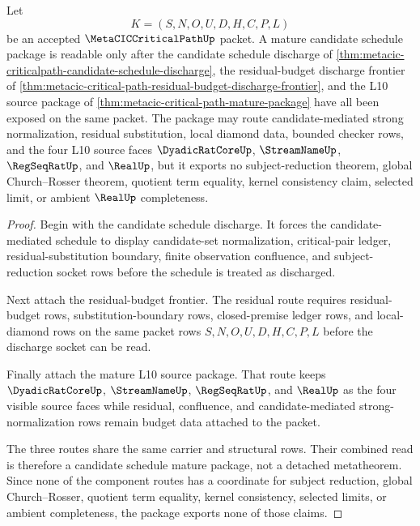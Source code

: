 \begin{theorem}
\label{thm:metaciccriticalpath-candidate-schedule-mature-package}
Let
$$
K=(S,N,O,U,D,H,C,P,L)
$$
be an accepted $\MetaCICCriticalPathUp$ packet. A mature candidate schedule package is readable only after the candidate schedule discharge of \autoref{thm:metacic-criticalpath-candidate-schedule-discharge}, the residual-budget discharge frontier of \autoref{thm:metacic-critical-path-residual-budget-discharge-frontier}, and the L10 source package of \autoref{thm:metacic-critical-path-mature-package} have all been exposed on the same packet. The package may route candidate-mediated strong normalization, residual substitution, local diamond data, bounded checker rows, and the four L10 source faces $\DyadicRatCoreUp$, $\StreamNameUp$, $\RegSeqRatUp$, and $\RealUp$, but it exports no subject-reduction theorem, global Church--Rosser theorem, quotient term equality, kernel consistency claim, selected limit, or ambient $\RealUp$ completeness.
\end{theorem}
\begin{proof}
Begin with the candidate schedule discharge. It forces the candidate-mediated schedule to display candidate-set normalization, critical-pair ledger, residual-substitution boundary, finite observation confluence, and subject-reduction socket rows before the schedule is treated as discharged.

Next attach the residual-budget frontier. The residual route requires residual-budget rows, substitution-boundary rows, closed-premise ledger rows, and local-diamond rows on the same packet rows $S,N,O,U,D,H,C,P,L$ before the discharge socket can be read.

Finally attach the mature L10 source package. That route keeps $\DyadicRatCoreUp$, $\StreamNameUp$, $\RegSeqRatUp$, and $\RealUp$ as the four visible source faces while residual, confluence, and candidate-mediated strong-normalization rows remain budget data attached to the packet.

The three routes share the same carrier and structural rows. Their combined read is therefore a candidate schedule mature package, not a detached metatheorem. Since none of the component routes has a coordinate for subject reduction, global Church--Rosser, quotient term equality, kernel consistency, selected limits, or ambient completeness, the package exports none of those claims.
\end{proof}

